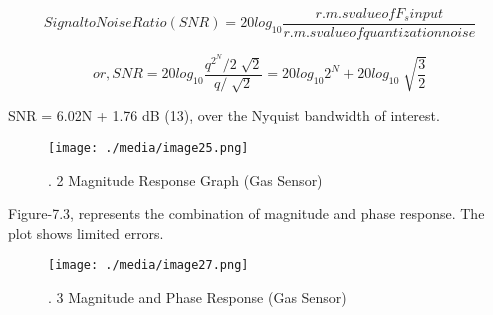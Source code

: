\begin{enumerate}
\begin{equation}\tag{3}
Signal to Noise Ratio (SNR) = 20log_{10}\frac{r.m.s value of F_{s} input}{r.m.s value of quantization noise}
\end{equation}

\begin{equation}\tag{4}
or, SNR = 20log_{10}\frac{q^{2^{N}}/2\sqrt[]{2}}{q/\sqrt[]{2}}=20log_{10}2^{N}+20log_{10}\sqrt[]{\frac{3}{2}}
\end{equation}
\begin{justify}
SNR = 6.02N + 1.76 dB (13), over the Nyquist bandwidth of interest.
\end{justify}\par




\begin{figure}[H]
	\begin{Center}
		\texttt{[image: ./media/image25.png]}
		\caption{. 2 Magnitude Response Graph (Gas Sensor)}
		\label{fig:_2_Magnitude_Response_Graph_Gas_Sensor}
	\end{Center}
\end{figure}



\par

\par

\begin{justify}
Figure-7.3, represents the combination of magnitude and phase response. The plot shows limited errors.
\end{justify}\par




\begin{figure}[H]
	\begin{Center}
		\texttt{[image: ./media/image27.png]}
		\caption{. 3 Magnitude and Phase Response (Gas Sensor) }
		\label{fig:_3_Magnitude_and_Phase_Response_Gas_Sensor_}
	\end{Center}
\end{figure}




\end{enumerate}
